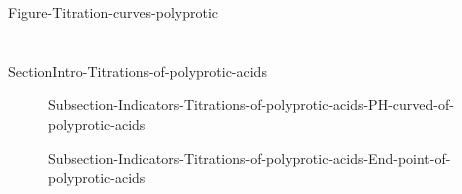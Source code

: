 \documentclass[main.tex]{subfiles}
\begin{document}
{%
 {Figure-Titration-curves-polyprotic}

\section{\color{blue!30!black}{Titrations of polyprotic acids}}{SectionIntro-Titrations-of-polyprotic-acids}
\sloppy\begin{description}
\item[] {Subsection-Indicators-Titrations-of-polyprotic-acids-PH-curved-of-polyprotic-acids}
\item[] {Subsection-Indicators-Titrations-of-polyprotic-acids-End-point-of-polyprotic-acids}
 \end{description}
}
 
\checkoddpage\ifoddpage \clearpage\thispagestyle{empty}\mbox{}\clearpage \else  \fi 
\end{document}
